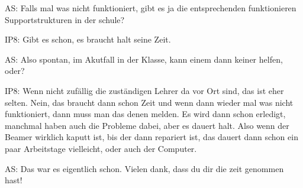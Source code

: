 \documentclass[fontsize=11pt,paper=a4]{scrbook}
\begin{document}
{\begin{itemize*}
		\item[AS:] Falls mal was nicht funktioniert, gibt es ja
		die entsprechenden funktionieren Supportstrukturen in der schule?
		\item[IP8:]  Gibt es schon, es braucht halt seine Zeit.
		\item[AS:] Also spontan, im Akutfall in der Klasse, kann einem dann keiner helfen, oder?
		\item[IP8:] Wenn nicht zufällig die zuständigen Lehrer da vor Ort sind, das ist eher selten. Nein, das braucht dann schon Zeit und wenn dann wieder mal was nicht funktioniert, dann muss man das denen melden. Es wird dann schon erledigt, manchmal haben auch die Probleme dabei, aber es dauert halt. Also wenn der Beamer wirklich kaputt ist, bis der dann repariert ist, das dauert dann schon ein paar Arbeitstage vielleicht, oder auch der Computer.
		\item[AS:] Das war es eigentlich
		schon. Vielen dank, dass du dir die zeit
		genommen hast!
\end{itemize*} 
}
\end{document}
